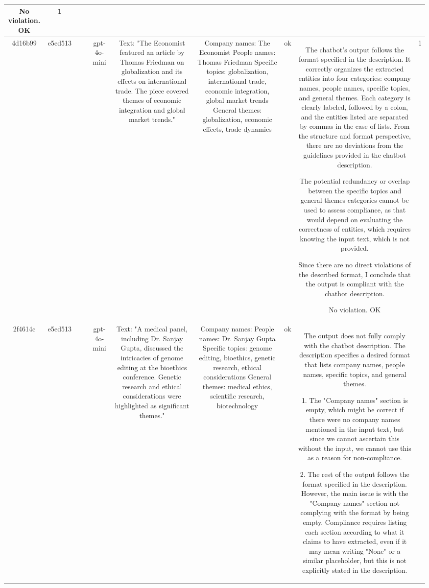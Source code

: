 \begin{table}[h!]
\begin{tabular}{|c|c|c|c|c|c|c|c|c|c|}
No violation.
OK & 1\\
\hline
4d16b99 & e5ed513 &  &  & gpt-4o-mini & Text: "The Economist featured an article by Thomas Friedman on globalization and its effects on international trade. The piece covered themes of economic integration and global market trends." & Company names: The Economist
People names: Thomas Friedman
Specific topics: globalization, international trade, economic integration, global market trends
General themes: globalization, economic effects, trade dynamics & ok & The chatbot's output follows the format specified in the description. It correctly organizes the extracted entities into four categories: company names, people names, specific topics, and general themes. Each category is clearly labeled, followed by a colon, and the entities listed are separated by commas in the case of lists. From the structure and format perspective, there are no deviations from the guidelines provided in the chatbot description.

The potential redundancy or overlap between the specific topics and general themes categories cannot be used to assess compliance, as that would depend on evaluating the correctness of entities, which requires knowing the input text, which is not provided. 

Since there are no direct violations of the described format, I conclude that the output is compliant with the chatbot description.

No violation.
OK & 1\\
\hline
2f4614c & e5ed513 &  &  & gpt-4o-mini & Text: "A medical panel, including Dr. Sanjay Gupta, discussed the intricacies of genome editing at the bioethics conference. Genetic research and ethical considerations were highlighted as significant themes." & Company names: 
People names: Dr. Sanjay Gupta
Specific topics: genome editing, bioethics, genetic research, ethical considerations
General themes: medical ethics, scientific research, biotechnology & ok & The output does not fully comply with the chatbot description. The description specifies a desired format that lists company names, people names, specific topics, and general themes. 

1. The "Company names" section is empty, which might be correct if there were no company names mentioned in the input text, but since we cannot ascertain this without the input, we cannot use this as a reason for non-compliance.

2. The rest of the output follows the format specified in the description. However, the main issue is with the "Company names" section not complying with the format by being empty. Compliance requires listing each section according to what it claims to have extracted, even if it may mean writing "None" or a similar placeholder, but this is not explicitly stated in the description.


\end{tabular}
\end{table}
